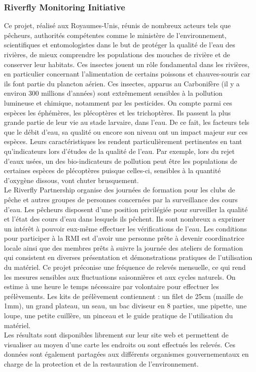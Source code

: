 \documentclass[10pt, conference, compsocconf]{llncs}
\begin{document}
		\subsubsection{Riverfly Monitoring Initiative}
			Ce projet, réalisé aux Royaumes-Unis, réunis de nombreux acteurs tels que pêcheurs, authorités compétentes comme le ministère de l'environnement, scientifiques et entomologistes dans le but de protéger la qualité de l'eau des rivières, de mieux comprendre les populations des mouches de rivière et de conserver leur habitats. Ces insectes jouent un rôle fondamental dans les rivières, en particulier concernant l'alimentation de certains poissons et chauves-souris car ils font partie du plancton aérien. Ces insectes, apparus au Carbonifère (il y a environ 300 millions d'années) sont extrêmement sensibles à la pollution lumineuse et chimique, notamment par les pesticides. On compte parmi ces espèces les éphémères, les plécoptères et les trichoptères. Ils passent la plus grande partie de leur vie au stade larvaire, dans l'eau. De ce fait, les facteurs tels que le débit d'eau, sa qualité ou encore son niveau ont un impact majeur sur ces espèces. Leurs caractéristiques les rendent particulièrement pertinentes en tant qu'indicateurs lors d'études de la qualité de l'eau. Par exemple, lors du rejet d'eaux usées, un des bio-indicateurs de pollution peut être les populations de certaines espèces de plécoptères puisque celles-ci, sensibles à la quantité d'oxygène dissous, vont chuter brusquement. \\
			Le Riverfly Partnership organise des journées de formation pour les clubs de pêche et autres groupes de personnes concernées par la surveillance des cours d'eau. Les pêcheurs disposent d'une position privilégiée pour surveiller la qualité et l'état des cours d'eau dans lesquels ils pêchent. Ils sont nombreux a exprimer un intérêt à pouvoir eux-même effectuer les vérifications de l'eau. Les conditions pour participer à la RMI est d'avoir une personne prête à devenir coordinatrice locale ainsi que des membres prêts à suivre la journée des ateliers de formation qui consistent en diverses présentation et démonstrations pratiques de l'utilisation du matériel. 
			Ce projet préconise une fréquence de relevés mensuelle, ce qui rend les mesures sensibles aux fluctuations saisonnières et aux cycles naturels. On estime à une heure le temps nécessaire par volontaire pour effectuer les prélèvements. Les kits de prélèvement contiennent : un filet de 25cm (maille de 1mm), un grand plateau, un seau, un bac diviseur en 8 parties, une pipette, une loupe, une petite cuillère, un pinceau et le guide pratique de l'utilisation du matériel.\\
			Les résultats sont disponibles librement sur leur site web et permettent de visualiser au moyen d'une carte les endroits ou sont effectués les relevés. Ces données sont également partagées aux différents organismes gouvernementaux en charge de la protection et de la restauration de  l'environnement.
		
\end{document}
